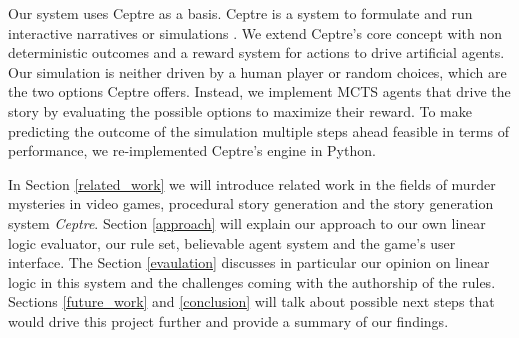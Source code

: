 Our system uses Ceptre as a basis. Ceptre is a system to formulate and run interactive narratives or simulations \cite{martens_2015}.
We extend Ceptre's core concept with non deterministic outcomes and a reward system for actions to drive artificial agents.
Our simulation is neither driven by a human player or random choices, which are the two options Ceptre offers.
Instead, we implement MCTS agents that drive the story by evaluating the possible options to maximize their reward.
To make predicting the outcome of the simulation multiple steps ahead feasible in terms of performance, we re-implemented Ceptre's engine in Python.

In Section \ref{related_work} we will introduce related work in the fields of murder mysteries in video games, procedural story generation and the story generation system \emph{Ceptre}.
Section \ref{approach} will explain our approach to our own linear logic evaluator, our rule set, believable agent system and the game's user interface.
The Section \ref{evaulation} discusses in particular our opinion on linear logic in this system and the challenges coming with the authorship of the rules.
Sections \ref{future_work} and \ref{conclusion} will talk about possible next steps that would drive this project further and provide a summary of our findings.
